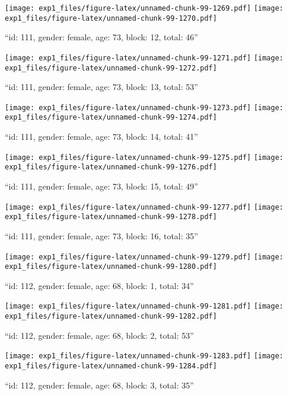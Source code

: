 \documentclass[,]{article}
\begin{document}
\texttt{[image: exp1\_files/figure-latex/unnamed-chunk-99-1269.pdf]}
\texttt{[image: exp1\_files/figure-latex/unnamed-chunk-99-1270.pdf]}

\newpage
[1] 

``id: 111, gender: female, age: 73, block: 12, total: 46''

\texttt{[image: exp1\_files/figure-latex/unnamed-chunk-99-1271.pdf]}
\texttt{[image: exp1\_files/figure-latex/unnamed-chunk-99-1272.pdf]}

\newpage
[1] 

``id: 111, gender: female, age: 73, block: 13, total: 53''

\texttt{[image: exp1\_files/figure-latex/unnamed-chunk-99-1273.pdf]}
\texttt{[image: exp1\_files/figure-latex/unnamed-chunk-99-1274.pdf]}

\newpage
[1] 

``id: 111, gender: female, age: 73, block: 14, total: 41''

\texttt{[image: exp1\_files/figure-latex/unnamed-chunk-99-1275.pdf]}
\texttt{[image: exp1\_files/figure-latex/unnamed-chunk-99-1276.pdf]}

\newpage
[1] 

``id: 111, gender: female, age: 73, block: 15, total: 49''

\texttt{[image: exp1\_files/figure-latex/unnamed-chunk-99-1277.pdf]}
\texttt{[image: exp1\_files/figure-latex/unnamed-chunk-99-1278.pdf]}

\newpage
[1] 

``id: 111, gender: female, age: 73, block: 16, total: 35''

\texttt{[image: exp1\_files/figure-latex/unnamed-chunk-99-1279.pdf]}
\texttt{[image: exp1\_files/figure-latex/unnamed-chunk-99-1280.pdf]}

\newpage
[1] 

``id: 112, gender: female, age: 68, block: 1, total: 34''

\texttt{[image: exp1\_files/figure-latex/unnamed-chunk-99-1281.pdf]}
\texttt{[image: exp1\_files/figure-latex/unnamed-chunk-99-1282.pdf]}

\newpage
[1] 

``id: 112, gender: female, age: 68, block: 2, total: 53''

\texttt{[image: exp1\_files/figure-latex/unnamed-chunk-99-1283.pdf]}
\texttt{[image: exp1\_files/figure-latex/unnamed-chunk-99-1284.pdf]}

\newpage
[1] 

``id: 112, gender: female, age: 68, block: 3, total: 35''
\end{document}
